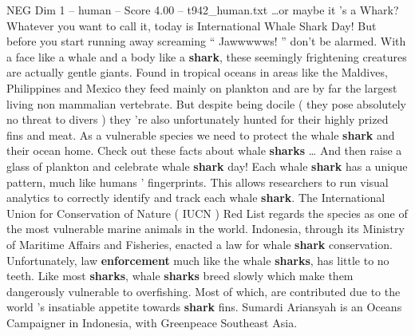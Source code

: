 \begin{textsample}{NEG Dim 1 – human – Score 4.00 – t942\_human.txt}  \label{ex:f1_neg_048}
…or maybe it ’s a Whark?
Whatever you want to call it, today is International Whale Shark Day!
But before you start running away screaming “ Jawwwwws! ” don't be alarmed.
With a face like a whale and a body like a \textbf{shark}, these seemingly frightening creatures are actually gentle giants.
Found in tropical oceans in areas like the Maldives, Philippines and Mexico they feed mainly on plankton and are by far the largest living non mammalian vertebrate.
But despite being docile ( they pose absolutely no threat to divers ) they ’re also unfortunately hunted for their highly prized fins and meat.
As a vulnerable species we need to protect the whale \textbf{shark} and their ocean home.
Check out these facts about whale \textbf{sharks} … And then raise a glass of plankton and celebrate whale \textbf{shark} day!
Each whale \textbf{shark} has a unique pattern, much like humans ’ fingerprints.
This allows researchers to run visual analytics to correctly identify and track each whale \textbf{shark}.
The International Union for Conservation of Nature ( IUCN ) Red List regards the species as one of the most vulnerable marine animals in the world.
Indonesia, through its Ministry of Maritime Affairs and Fisheries, enacted a law for whale \textbf{shark} conservation.
Unfortunately, law \textbf{enforcement} much like the whale \textbf{sharks}, has little to no teeth.
Like most \textbf{sharks}, whale \textbf{sharks} breed slowly which make them dangerously vulnerable to overfishing.
Most of which, are contributed due to the world ’s insatiable appetite towards \textbf{shark} fins.
Sumardi Ariansyah is an Oceans Campaigner in Indonesia, with Greenpeace Southeast Asia.

\end{textsample}
